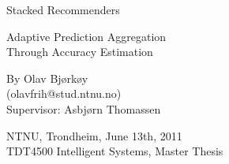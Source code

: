 \null\vspace{6em}
{
\setlength{\parindent}{0em}
\setlength{\parskip}{1em}
\centering

\HUGE
Stacked Recommenders\\
\LARGE
\vspace{1em}

Adaptive Prediction Aggregation\\
Through Accuracy Estimation\\

\Large
\vspace{4em}

By Olav Bjørkøy\\
(olavfrih@stud.ntnu.no)\\
Supervisor: Asbjørn Thomassen \\

\vspace{2em}

NTNU, Trondheim, June 13th, 2011 \\
TDT4500 Intelligent Systems, Master Thesis \\

\vfill

}
\clearpage
